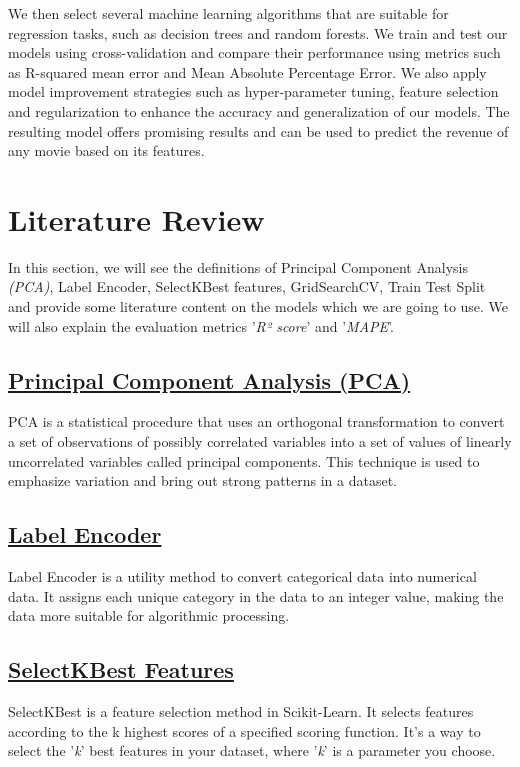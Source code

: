 \documentclass[conference]{IEEEtran}
\begin{document}
        We then select several machine learning algorithms that are suitable for regression tasks, such as decision trees and random forests. We train and test our models using cross-validation and compare their performance using metrics such as R-squared mean error and Mean Absolute Percentage Error. We also apply model improvement strategies such as hyper-parameter tuning, feature selection and regularization to enhance the accuracy and generalization of our models. The resulting model offers promising results and can be used to predict the revenue of any movie based on its features.

\section{Literature Review}
    In this section, we will see the definitions of Principal Component Analysis \textit{(PCA)}, Label Encoder, SelectKBest features, GridSearchCV, Train Test Split and provide some literature content on the models which we are going to use. We will also explain the evaluation metrics '\textit{R² score}' and '\textit{MAPE}'.
    
    \subsection*{\href{https://en.wikipedia.org/wiki/Principal_component_analysis}{Principal Component Analysis (PCA)}}
    PCA is a statistical procedure that uses an orthogonal transformation to convert a set of observations of possibly correlated variables into a set of values of linearly uncorrelated variables called principal components. This technique is used to emphasize variation and bring out strong patterns in a dataset.
    
    \subsection*{\href{https://scikit-learn.org/stable/modules/generated/sklearn.preprocessing.LabelEncoder.html}{Label Encoder}}
    Label Encoder is a utility method to convert categorical data into numerical data. It assigns each unique category in the data to an integer value, making the data more suitable for algorithmic processing.
    
    \subsection*{\href{https://scikit-learn.org/stable/modules/generated/sklearn.feature_selection.SelectKBest.html}{SelectKBest Features}}
    SelectKBest is a feature selection method in Scikit-Learn. It selects features according to the k highest scores of a specified scoring function. It's a way to select the '\textit{k}' best features in your dataset, where '\textit{k}' is a parameter you choose.
    
\end{document}
